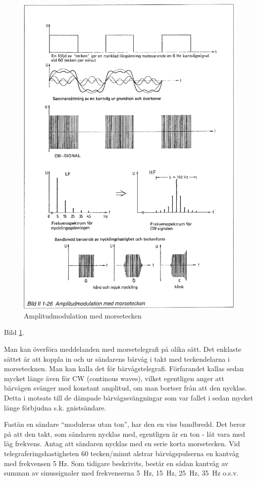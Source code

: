 \begin{figure}
\includegraphics[width=\textwidth]{images/bild_2_1-26}
\caption{Amplitudmodulation med morsetecken}
\label{fig:BildII1-26}
\end{figure}

Bild \ref{fig:BildII1-26}.

Man kan överföra meddelanden med morsetelegrafi på olika sätt. Det enklaste
sättet är att koppla in och ur sändarens bärvåg i takt med teckendelarna i
morsetecknen. Man kan kalla det för bärvågstelegrafi. Förfarandet kallas sedan
mycket länge även för CW (continous waves), vilket egentligen anger att
bärvågen svänger med konstant amplitud, om man bortser från att den nycklas.
Detta i motsats till de dämpade bärvågssvängningar som var fallet i sedan
mycket länge förbjudna s.k. gnistsändare.

Fastän en sändare ``moduleras utan ton'', har den en viss bandbredd. Det beror på
att den takt, som sändaren nycklas med, egentligen är en ton - låt vara med låg
frekvens. Antag att sändaren nycklas med en serie korta morsetecken. Vid
telegraferingshastigheten 60 tecken/minut alstrar bärvågspulserna en kantvåg
med frekvensen 5 Hz. Som tidigare beskrivits, består en sådan kantvåg av summan
av sinussignaler med frekvenserna 5~Hz, 15~Hz, 25~Hz, 35~Hz o.s.v.

